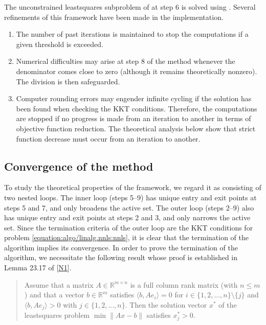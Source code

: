 \documentclass[letterpaper,10pt,english]{sphinxmanual}
\newcommand{\norm}[2][]{#1\lVert#2#1\rVert}
\newcommand{\set}[2][]{#1\{#2#1\}}
\newcommand{\inner}[2][]{#1\langle#2#1\rangle}
\def\R{\ensuremath{\mathds{R}}}
\begin{document}
\sphinxAtStartPar
The unconstrained least\sphinxhyphen{}squares subproblem of  at step 6 is solved using
. Several refinements of this framework have been made in
the implementation.
\begin{enumerate}
%
\item {} 
\sphinxAtStartPar
The number of past iterations is maintained to stop the computations if a
given threshold is exceeded.

\item {} 
\sphinxAtStartPar
Numerical difficulties may arise at step 8 of the method whenever the
denominator comes close to zero (although it remains theoretically nonzero).
The division is then safeguarded.

\item {} 
\sphinxAtStartPar
Computer rounding errors may engender infinite cycling if the solution has
been found when checking the KKT conditions. Therefore, the computations are
stopped if no progress is made from an iteration to another in terms of
objective function reduction. The theoretical analysis below show that
strict function decrease must occur from an iteration to another.

\end{enumerate}


\subsection{Convergence of the method}
\label{\detokenize{algo/linalg.nnls:convergence-of-the-method}}
\sphinxAtStartPar
To study the theoretical properties of the framework, we regard it as
consisting of two nested loops. The inner loop (steps 5–9) has unique entry
and exit points at steps 5 and 7, and only broadens the active set. The outer
loop (steps 2–9) also has unique entry and exit points at steps 2 and 3, and
only narrows the active set. Since the termination criteria of the outer loop
are the KKT conditions for problem \eqref{equation:algo/linalg.nnls:nnls}, it is clear that the termination
of the algorithm implies its convergence. In order to prove the termination of
the algorithm, we necessitate the following result whose proof is established
in Lemma 23.17 of {[}\hyperlink{cite.algo/linalg.nnls:cite-1-nnls-lawson-hanson-1974}{N1}{]}.
\begin{quote}

\sphinxAtStartPar
{} Assume that a matrix \(A \in \R^{m \times n}\) is a full
column rank matrix (with \(n \le m\)) and that a vector
\(b \in \R^m\) satisfies \(\inner{b, Ae_i} = 0\) for
\(i \in \set{1, 2, \dots, n} \setminus \set{j}\) and
\(\inner{b, Ae_j} > 0\) with \(j \in \set{1, 2, \dots, n}\). Then
the solution vector \(x^{\ast}\) of the least\sphinxhyphen{}squares problem
\(\min \norm{Ax - b}\) satisfies \(x_j^{\ast} > 0\).
\end{quote}
\end{document}

